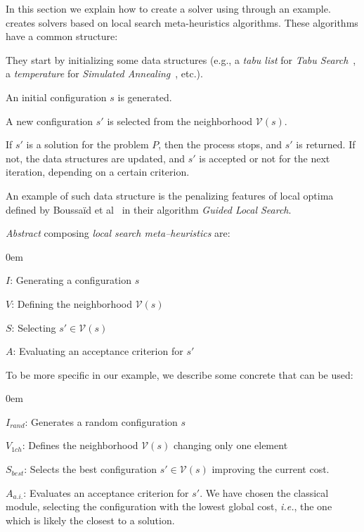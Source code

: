 In this section we explain how to create a solver using \posl{} through an example. \posl{} creates solvers based on local search meta-heuristics algorithms. These algorithms have a common structure: \begin{inparaenum}[1.] \item They start by initializing some data structures (e.g., a \emph{tabu list} for \emph{Tabu Search}~\cite{Gendreau2010}, a \emph{temperature} for \emph{Simulated Annealing}~\cite{Nikolaev2010}, etc.). \item An initial configuration $s$ is generated. \item A new configuration $s'$ is selected from the neighborhood $\mathcal{V}\left(s\right)$. \item If $s'$ is a solution for the problem $P$, then the process stops, and $s'$ is returned. If not, the data structures are updated, and $s'$ is accepted or not for the next iteration, depending on a certain criterion.\end{inparaenum}
An example of such data structure is the penalizing features of local optima defined by Boussaïd et al~\cite{Boussaid2013} in their algorithm \emph{Guided Local Search}.


{\it Abstract} \oms{} composing \emph{local search meta--heuristics} are:

\begin{list}{}{} \itemsep0em 
	\item $I$: Generating a configuration $s$
	\item $V$: Defining the neighborhood $\mathcal{V}\left(s\right)$
	\item $S$: Selecting $s' \in \mathcal{V}\left(s\right)$
	\item $A$: Evaluating an acceptance criterion for $s'$
\end{list}

To be more specific in our example, we describe some concrete \oms{} that can be used:

\begin{list}{}{} \itemsep0em 
	\item $I_{rand}$: Generates a random configuration $s$ \label{estruct:S}
	\item $V_{1ch}$: Defines the neighborhood $\mathcal{V}\left(s\right)$ changing only one element \label{estruct:V}
	\item $S_{best}$: Selects the best configuration $s' \in \mathcal{V}\left(s\right)$ improving the current cost. \label{estruct:SS}
	\item $A_{a.i.}$: Evaluates an acceptance criterion for $s'$. We have chosen the classical module, selecting the configuration with the lowest global cost, {\it i.e.}, the one which is likely the closest to a solution. \label{estruct:A}
\end{list}

